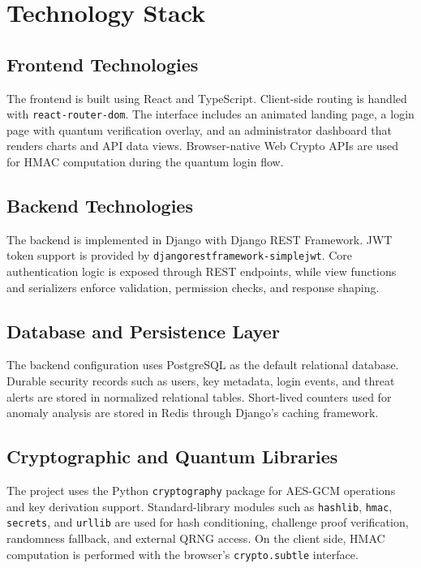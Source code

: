 \documentclass[12pt,a4paper]{report}
\begin{document}
\section{Technology Stack}

\subsection{Frontend Technologies}
The frontend is built using React and TypeScript. Client-side routing is handled with \texttt{react-router-dom}. The interface includes an animated landing page, a login page with quantum verification overlay, and an administrator dashboard that renders charts and API data views. Browser-native Web Crypto APIs are used for HMAC computation during the quantum login flow.

\subsection{Backend Technologies}
The backend is implemented in Django with Django REST Framework. JWT token support is provided by \texttt{djangorestframework-simplejwt}. Core authentication logic is exposed through REST endpoints, while view functions and serializers enforce validation, permission checks, and response shaping.

\subsection{Database and Persistence Layer}
The backend configuration uses PostgreSQL as the default relational database. Durable security records such as users, key metadata, login events, and threat alerts are stored in normalized relational tables. Short-lived counters used for anomaly analysis are stored in Redis through Django's caching framework.

\subsection{Cryptographic and Quantum Libraries}
The project uses the Python \texttt{cryptography} package for AES-GCM operations and key derivation support. Standard-library modules such as \texttt{hashlib}, \texttt{hmac}, \texttt{secrets}, and \texttt{urllib} are used for hash conditioning, challenge proof verification, randomness fallback, and external QRNG access. On the client side, HMAC computation is performed with the browser's \texttt{crypto.subtle} interface.
\end{document}
